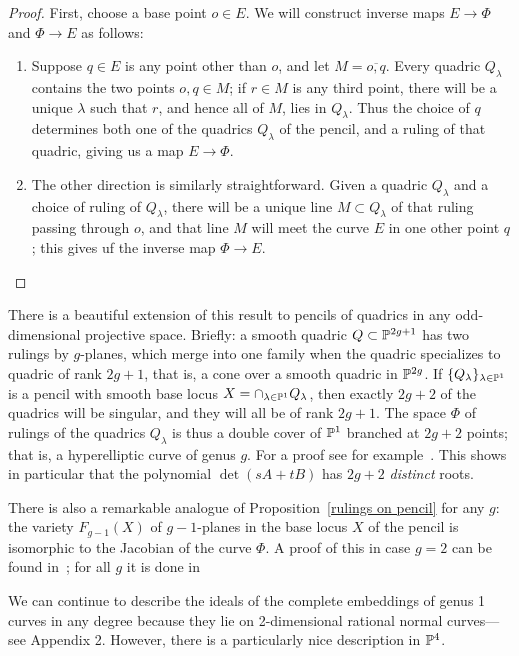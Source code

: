 \begin{proof}
First, choose a base point $o \in E$. We will construct inverse maps $E \to \Phi$ and $\Phi \to E$ as follows:
\begin{enumerate}
\item Suppose $q \in E$ is any point other than $o$, and let $M = \overline{o,q}$. Every quadric $Q_\lambda$ contains the two points $o, q \in M$; if $r \in M$ is any third point, there will be a unique $\lambda$ such that $r$, and hence all of $M$, lies in $Q_\lambda$. Thus the choice of $q$ determines both one of the quadrics $Q_\lambda$ of the pencil, and a ruling of that quadric, giving us a map $E \to \Phi$.
\item The other direction is similarly straightforward. Given a quadric $Q_\lambda$ and a choice of ruling of $Q_\lambda$, there will be a unique line $M \subset Q_\lambda$ of that ruling passing through $o$, and that line $M$ will meet the curve $E$ in one other point $q$; this gives uf the inverse map $\Phi \to E$.
\end{enumerate}
\end{proof}

There is a beautiful extension of this result to pencils of quadrics in any odd-dimensional projective space. Briefly: a smooth quadric $Q \subset {\mathbb P}^{2g+1}$ has two rulings by $g$-planes, which merge into one family when the quadric specializes to quadric of rank $2g+1$, that is, a cone over a smooth quadric in ${\mathbb P}^{2g}$. If $\{Q_\lambda\}_{\lambda \in {\mathbb P}^1}$ is a pencil with smooth base locus $X = \cap_{\lambda \in {\mathbb P}^1} Q_\lambda$, then exactly $2g+2$ of the quadrics will be singular, and they will all be of rank $2g+1$. The space $\Phi$ of rulings of the quadrics $Q_\lambda$ is thus a double cover of ${\mathbb P}^1$ branched at $2g+2$  points; that is, a hyperelliptic curve of genus $g$. For a proof see for example~\cite[Proposition 22.34]{Harris1995}.
 This shows in particular that the polynomial $\det(sA+tB)$ has $2g+2$ \emph{distinct} roots. 


There is also a remarkable analogue of Proposition~\ref{rulings on pencil} for any $g$: the variety $F_{g-1}(X)$ of $g-1$-planes in the base locus $X$ of the pencil is isomorphic to the Jacobian of the  curve $\Phi$. A proof of this in case $g=2$ can be found in~\cite{Griffiths-Harris1978}; for all $g$ it is done in~\cite{Donagi}

We can continue to describe the ideals of the complete embeddings of genus 1 curves in any degree because they lie on 2-dimensional rational
normal curves---see Appendix 2. However, there is a particularly nice description in ${\mathbb P}^4$. 

